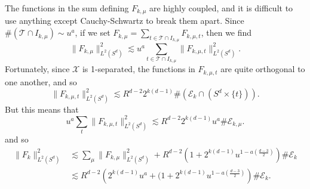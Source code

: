 \begin{comment}
    \item For $l > 2(\mu - \mu')$, if $(x_1,t_1) \in \mathcal{H}_{x_0,t_0,l}$, then $x_1$ lies in a geodesic annulus with thickness $O(u^a/R)$ and radius $\gtrsim l u^a / R$, centered at $x_0$. Thus $\mathcal{H}_{x_0,t_0,l}$ is covered by $O(l^{d-1})$ balls of radius $u^a / R$. The density properties of $\mathcal{E}_k$ imply that
    \[ \# \mathcal{H}_{x_0,t_0,l} \lesssim (Ru) l^{d-1} (u^a/R) = u^{a+1} l^{d-1}. \]
    Together with Lemma \ref{mainOrthogonalityLemma}, we conclude that
    \[ \sum_{(x_1,t_1) \in \mathcal{H}_{x_0,t_0,l}} |\langle {S\!}_{x_0,t_0}, {S\!}_{x_1,t_1} \rangle| \lesssim_M (u^{a+1} l^{d-1}) (l u^a)^{-M}. \]
    Picking $M \gtrsim d$ and summing over $l > 2 (\mu - \mu')$, $\mu' \leq \mu - 10$, and $(x_0,t_0) \in \mathcal{E}_{k,\mu}$ gives that
    \[ \sum_{(x_0,t_0) \in \mathcal{E}_{k,\mu}} \sum_{\mu' \leq \mu - 10} \sum_{(\mu - \mu')/2 \leq l} \sum_{(x_1,t_1) \in \mathcal{H}_{x_0,t_0,l}} |\langle {S\!}_{x_0,t_0}, {S\!}_{x_1,t_1} \rangle| \lesssim \# \mathcal{E}_{k,\mu}. \]
\end{itemize}
%
Thus we have, using that $\mu \lesssim 2^k / u^a$, we conclude that
%
\begin{align*}
    \| F_k \|_{L^2(S^d)}^2 &\lesssim \sum_\mu \| F_{k,\mu} \|_{L^2(S^d)}^2 + \sum_\mu \left( 1 + u^{1 - a \left( \frac{d-3}{2} \right)} \mu^{\frac{d+1}{2}} \right) \# \mathcal{E}_{k,\mu}\\
    &= \sum_\mu \| F_{k,\mu} \|_{L^2(S^d)}^2 + \left( 1 + 2^{k \frac{d+1}{2}} u^{1 - a (d-1)} \right) \# \mathcal{E}_k.
\end{align*}
%
\end{comment}
The functions in the sum defining $F_{k,\mu}$ are highly coupled, and it is difficult to use anything except Cauchy-Schwartz to break them apart. Since $\# ( \mathcal{T} \cap I_{k,\mu}) \sim u^a$, if we set $F_{k,\mu} = \sum_{t \in \mathcal{T} \cap I_{k,\mu}} F_{k,\mu,t}$, then we find
%
\[ \| F_{k,\mu} \|_{L^2(S^d)}^2 \lesssim u^a \sum_{t \in \mathcal{T} \cap I_{k,\mu}} \| F_{k,\mu,t} \|_{L^2(S^d)}^2. \]
%
Fortunately, since $\mathcal{X}$ is 1-separated, the functions in $F_{k,\mu,t}$ are quite orthogonal to one another, and so
%
\[ \| F_{k,\mu,t} \|_{L^2(S^d)}^2 \lesssim R^{d-2} 2^{k(d-1)} \# (\mathcal{E}_k \cap (S^d \times \{ t \})). \]
%
But this means that
%
\[ u^a \sum_t \| F_{k,\mu,t} \|_{L^2(S^d)}^2 \lesssim R^{d-2} 2^{k(d-1)} u^a \# \mathcal{E}_{k,\mu}. \]
%
and so
%
\begin{align*}
    \| F_k \|_{L^2(S^d)}^2 &\lesssim \sum_\mu \| F_{k,\mu} \|_{L^2(S^d)}^2 + R^{d-2} \left( 1 + 2^{k(d-1)} u^{1 - a \left( \frac{d-3}{2} \right)} \right) \# \mathcal{E}_k\\
    &\lesssim R^{d-2} \left( 2^{k(d-1)} u^a + (1 + 2^{k(d-1)} u^{1 - a \left( \frac{d-3}{2} \right)} \right) \# \mathcal{E}_k.
\end{align*}
